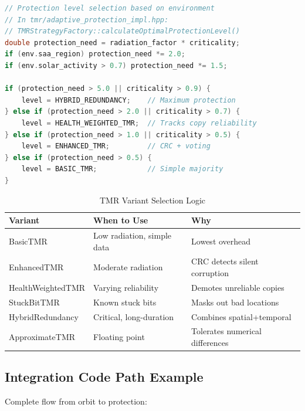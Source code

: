 \documentclass[11pt,a4paper]{article}
\begin{document}
\begin{lstlisting}[language=C++, basicstyle=\footnotesize\ttfamily]
// Protection level selection based on environment
// In tmr/adaptive_protection_impl.hpp:
// TMRStrategyFactory::calculateOptimalProtectionLevel()
double protection_need = radiation_factor * criticality;
if (env.saa_region) protection_need *= 2.0;
if (env.solar_activity > 0.7) protection_need *= 1.5;

if (protection_need > 5.0 || criticality > 0.9) {
    level = HYBRID_REDUNDANCY;    // Maximum protection
} else if (protection_need > 2.0 || criticality > 0.7) {
    level = HEALTH_WEIGHTED_TMR;  // Tracks copy reliability
} else if (protection_need > 1.0 || criticality > 0.5) {
    level = ENHANCED_TMR;         // CRC + voting
} else if (protection_need > 0.5) {
    level = BASIC_TMR;            // Simple majority
}
\end{lstlisting}

\begin{table}[htbp]
\centering
\caption{TMR Variant Selection Logic}
\begin{tabular}{@{}lll@{}}
\toprule
\textbf{Variant} & \textbf{When to Use} & \textbf{Why} \\
\midrule
BasicTMR & Low radiation, simple data & Lowest overhead \\
EnhancedTMR & Moderate radiation & CRC detects silent corruption \\
HealthWeightedTMR & Varying reliability & Demotes unreliable copies \\
StuckBitTMR & Known stuck bits & Masks out bad locations \\
HybridRedundancy & Critical, long-duration & Combines spatial+temporal \\
ApproximateTMR & Floating point & Tolerates numerical differences \\
\bottomrule
\end{tabular}
\end{table}

\subsection{Integration Code Path Example}

Complete flow from orbit to protection:
\end{document}
